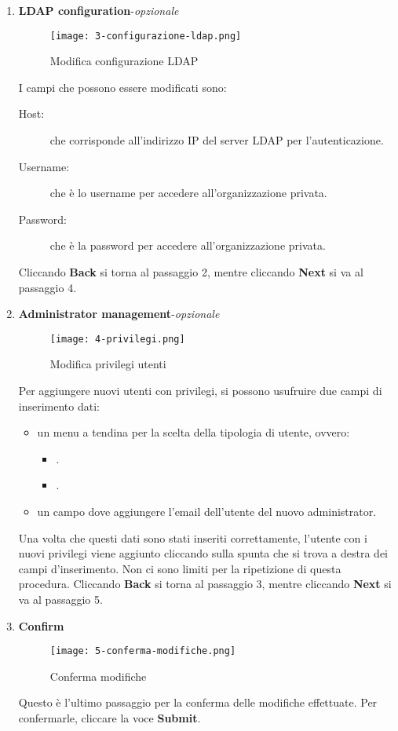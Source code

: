 \documentclass[../manuale-utente.tex]{subfiles}
\begin{document}
\begin{enumerate}
    \item \textbf{LDAP configuration}-\textit{opzionale}

    \begin{figure}[H]
        \centering
        \texttt{[image: 3-configurazione-ldap.png]}
        \caption{Modifica configurazione LDAP}%
        \label{fig:web_app_modifica_configurazione_ldap}
    \end{figure}
    I campi che possono essere modificati sono:
    \begin{description}
        \item[Host:] che corrisponde all'indirizzo IP del server LDAP per l'autenticazione.
        \item[Username:] che è lo username per accedere all'organizzazione privata.
        \item[Password:] che è la password per accedere all'organizzazione privata.
    \end{description}
    Cliccando \textbf{Back} si torna al passaggio 2, mentre cliccando \textbf{Next} si va al passaggio 4.

    \item \textbf{Administrator management}-\textit{opzionale}

    \begin{figure}[H]
        \centering
        \texttt{[image: 4-privilegi.png]}
        \caption{Modifica privilegi utenti}%
        \label{fig:web_app_modifica_privilegi_utenti}
    \end{figure}
    Per aggiungere nuovi utenti con privilegi, si possono usufruire due campi di inserimento dati:
    \begin{itemize}
        \item un menu a tendina per la scelta della tipologia di utente, ovvero:
        \begin{itemize}
            \item {}.
            \item {}.
        \end{itemize}
        \item un campo dove aggiungere l'email dell'utente del nuovo administrator.
    \end{itemize}
    Una volta che questi dati sono stati inseriti correttamente, l'utente con i nuovi privilegi viene aggiunto cliccando sulla spunta che si trova a destra dei campi d'inserimento.
    Non ci sono limiti per la ripetizione di questa procedura.
    Cliccando \textbf{Back} si torna al passaggio 3, mentre cliccando \textbf{Next} si va al passaggio 5.

    \item \textbf{Confirm}

    \begin{figure}[H]
        \centering
        \texttt{[image: 5-conferma-modifiche.png]}
        \caption{Conferma modifiche}%
        \label{fig:web_app_conferma_modifiche}
    \end{figure}
    Questo è l'ultimo passaggio per la conferma delle modifiche effettuate. Per confermarle, cliccare la voce \textbf{Submit}.
\end{enumerate}
\end{document}
